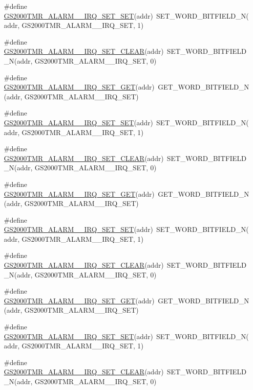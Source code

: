 \begin{DoxyCompactItemize}
\item 
\#define \hyperlink{a00555_ab4ee1906290f1bdc427c121d9850ca21}{GS2000TMR\_\-ALARM\_\_\-IRQ\_\-SET\_\-SET}(addr)~SET\_\-WORD\_\-BITFIELD\_\-N(addr, GS2000TMR\_\-ALARM\_\_\-IRQ\_\-SET, 1)
\item 
\#define \hyperlink{a00555_ae24fb0626d7ce20504d0cee6a0fcaf83}{GS2000TMR\_\-ALARM\_\_\-IRQ\_\-SET\_\-CLEAR}(addr)~SET\_\-WORD\_\-BITFIELD\_\-N(addr, GS2000TMR\_\-ALARM\_\_\-IRQ\_\-SET, 0)
\item 
\#define \hyperlink{a00555_abfda9928b1bb4b555b52d0ceab7cb8d5}{GS2000TMR\_\-ALARM\_\_\-IRQ\_\-SET\_\-GET}(addr)~GET\_\-WORD\_\-BITFIELD\_\-N(addr, GS2000TMR\_\-ALARM\_\_\-IRQ\_\-SET)
\item 
\#define \hyperlink{a00555_a34812d67b1fd74f499f9818495b9a7d8}{GS2000TMR\_\-ALARM\_\_\-IRQ\_\-SET\_\-SET}(addr)~SET\_\-WORD\_\-BITFIELD\_\-N(addr, GS2000TMR\_\-ALARM\_\_\-IRQ\_\-SET, 1)
\item 
\#define \hyperlink{a00555_a35b10c13b94976777445adb3c2cd64e2}{GS2000TMR\_\-ALARM\_\_\-IRQ\_\-SET\_\-CLEAR}(addr)~SET\_\-WORD\_\-BITFIELD\_\-N(addr, GS2000TMR\_\-ALARM\_\_\-IRQ\_\-SET, 0)
\item 
\#define \hyperlink{a00555_a87043b8d4ea9a9e394e3d1264aefdfb0}{GS2000TMR\_\-ALARM\_\_\-IRQ\_\-SET\_\-GET}(addr)~GET\_\-WORD\_\-BITFIELD\_\-N(addr, GS2000TMR\_\-ALARM\_\_\-IRQ\_\-SET)
\item 
\#define \hyperlink{a00555_a671196b17a6042819cb7a9dce68b0e9c}{GS2000TMR\_\-ALARM\_\_\-IRQ\_\-SET\_\-SET}(addr)~SET\_\-WORD\_\-BITFIELD\_\-N(addr, GS2000TMR\_\-ALARM\_\_\-IRQ\_\-SET, 1)
\item 
\#define \hyperlink{a00555_a95da8e22aa53f2cd1cc9d4283d4b9672}{GS2000TMR\_\-ALARM\_\_\-IRQ\_\-SET\_\-CLEAR}(addr)~SET\_\-WORD\_\-BITFIELD\_\-N(addr, GS2000TMR\_\-ALARM\_\_\-IRQ\_\-SET, 0)
\item 
\#define \hyperlink{a00555_a5daa6f4d099adc172c8aef3faee4b32c}{GS2000TMR\_\-ALARM\_\_\-IRQ\_\-SET\_\-GET}(addr)~GET\_\-WORD\_\-BITFIELD\_\-N(addr, GS2000TMR\_\-ALARM\_\_\-IRQ\_\-SET)
\item 
\#define \hyperlink{a00555_a88b0814d9f0e2f0df18597802af09d1c}{GS2000TMR\_\-ALARM\_\_\-IRQ\_\-SET\_\-SET}(addr)~SET\_\-WORD\_\-BITFIELD\_\-N(addr, GS2000TMR\_\-ALARM\_\_\-IRQ\_\-SET, 1)
\item 
\#define \hyperlink{a00555_a8cb3b43f684e77339bd007164eb6c5ce}{GS2000TMR\_\-ALARM\_\_\-IRQ\_\-SET\_\-CLEAR}(addr)~SET\_\-WORD\_\-BITFIELD\_\-N(addr, GS2000TMR\_\-ALARM\_\_\-IRQ\_\-SET, 0)

\end{DoxyCompactItemize}
